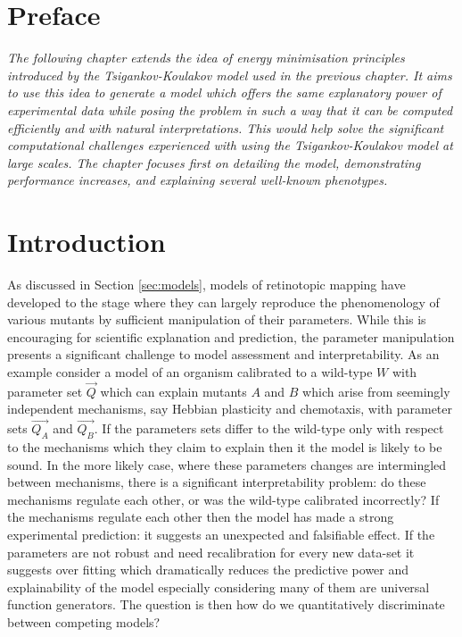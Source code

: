 \section{Preface}
\textit{The following chapter extends the idea of energy minimisation principles introduced by the Tsigankov-Koulakov model used in the previous chapter. It aims to use this idea to generate a model which offers the same explanatory power of experimental data while posing the problem in such a way that it can be computed efficiently and with natural interpretations. This would help solve the significant computational challenges experienced with using the Tsigankov-Koulakov model at large scales. The chapter focuses first on detailing the model, demonstrating performance increases, and explaining several well-known phenotypes.}

\section{Introduction}
As discussed in Section \ref{sec:models}, models of retinotopic mapping have developed to the stage where they can largely reproduce the phenomenology of various mutants by sufficient manipulation of their parameters. While this is encouraging for scientific explanation and prediction, the parameter manipulation presents a significant challenge to model assessment and interpretability. As an example consider a model of an organism calibrated to a wild-type $W$ with parameter set $\vec{Q}$ which can explain mutants $A$ and $B$ which arise from seemingly independent mechanisms, say Hebbian plasticity and chemotaxis, with parameter sets $\vec{Q_A}$ and $\vec{Q_B}$. If the parameters sets differ to the wild-type only with respect to the mechanisms which they claim to explain then it the model is likely to be sound. In the more likely case, where these parameters changes are intermingled between mechanisms, there is a significant interpretability problem: do these mechanisms regulate each other, or was the wild-type calibrated incorrectly? If the mechanisms regulate each other then the model has made a strong experimental prediction: it suggests an unexpected and falsifiable effect. If the parameters are not robust and need recalibration for every new data-set it suggests over fitting which dramatically reduces the predictive power and explainability of the model especially considering many of them are universal function generators. The question is then how do we quantitatively discriminate between competing models?

